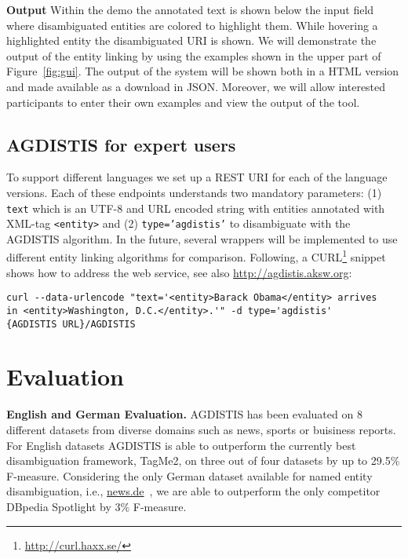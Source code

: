 \documentclass{llncs}
\begin{document}
\noindent\textbf{Output}
Within the demo the annotated text is shown below the input field where disambiguated entities are colored to highlight them. 
While hovering a highlighted entity the disambiguated URI is shown.
We will demonstrate the output of the entity linking by using the examples shown in the upper part of Figure~\ref{fig:gui}. 
The output of the system will be shown both in a HTML version and made available as a download in JSON. 
Moreover, we will allow interested participants to enter their own examples and view the output of the tool.

\subsection{AGDISTIS for expert users}

To support different languages we set up a REST URI for each of the language versions.
Each of these endpoints understands two mandatory parameters: (1) \texttt{text} which is an UTF-8 and URL encoded string with entities annotated with XML-tag \texttt{<entity>} and (2) \texttt{type='agdistis'} to disambiguate with the AGDISTIS algorithm.
In the future, several wrappers will be implemented to use different entity linking algorithms for comparison.
Following, a CURL\footnote{\url{http://curl.haxx.se/}} snippet shows how to address the web service, see also \url{http://agdistis.aksw.org}:
\begin{verbatim}
curl --data-urlencode "text='<entity>Barack Obama</entity> arrives 
in <entity>Washington, D.C.</entity>.'" -d type='agdistis' 
{AGDISTIS URL}/AGDISTIS
\end{verbatim}

\section{Evaluation}
\textbf{English and German Evaluation.} AGDISTIS has been evaluated on 8 different datasets from diverse domains such as news, sports or buisiness reports.
For English datasets AGDISTIS is able to outperform the currently best disambiguation framework, TagMe2, on three out of four datasets by up to 29.5\% F-measure. 
Considering the only German dataset available for named entity disambiguation, i.e., \url{news.de}~\cite{N3}, we are able to outperform the only competitor DBpedia Spotlight by 3\% F-measure.
\end{document}
